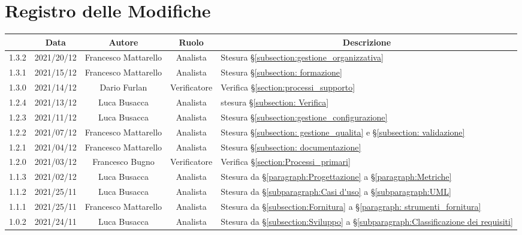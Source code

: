 \thispagestyle{empty}
\section*{Registro delle Modifiche}

\begin{center}
	\renewcommand{\arraystretch}{1.8}
	\begin{longtable}[c]{c | c | c | c | p{5cm}}
		\rowcolor[HTML]{125E28}
		\multicolumn{1}{c}{\color[HTML]{FFFFFF} \textbf{Versione}} & 
		\multicolumn{1}{c}{\color[HTML]{FFFFFF} \textbf{Data}} & 
		\multicolumn{1}{c}{\color[HTML]{FFFFFF} \textbf{Autore}} & 
		\multicolumn{1}{c}{\color[HTML]{FFFFFF} \textbf{Ruolo}} & 
		\multicolumn{1}{c}{\color[HTML]{FFFFFF} \textbf{Descrizione}} \\
		\endhead
		1.3.2 & 2021/20/12 & Francesco Mattarello & Analista & Stesura §\ref{subsection:gestione_organizzativa}\\
		1.3.1 & 2021/15/12 & Francesco Mattarello & Analista & Stesura §\ref{subsection: formazione}\\
		1.3.0 & 2021/14/12 & Dario Furlan & Verificatore & Verifica §\ref{section:processi_supporto}\\
		1.2.4 & 2021/13/12 & Luca Busacca & Analista & stesura §\ref{subsection: Verifica}\\
		1.2.3 & 2021/11/12 & Luca Busacca & Analista & Stesura  §\ref{subsection:gestione_configurazione} \\
		1.2.2 & 2021/07/12 & Francesco Mattarello & Analista & Stesura §\ref{subsection: gestione_qualita} e §\ref{subsection: validazione}\\
		1.2.1 & 2021/04/12 & Francesco Mattarello & Analista & Stesura §\ref{subsection: documentazione}\\
		1.2.0 & 2021/03/12 & Francesco Bugno & Verificatore & Verifica §\ref{section:Processi_primari} \\
		1.1.3 & 2021/02/12 & Luca Busacca & Analista & Stesura da  §\ref{paragraph:Progettazione} a §\ref{paragraph:Metriche} \\
		1.1.2 & 2021/25/11 & Luca Busacca & Analista & Stesura da  §\ref{subparagraph:Casi d'uso} a §\ref{subparagraph:UML} \\
		1.1.1 & 2021/25/11 & Francesco Mattarello & Analista & Stesura da §\ref{subsection:Fornitura} a §\ref{paragraph: strumenti_fornitura} \\
		1.0.2 & 2021/24/11 & Luca Busacca & Analista & Stesura da §\ref{subsection:Sviluppo} a  §\ref{subparagraph:Classificazione dei requisiti} \\

\end{longtable}
\end{center}

